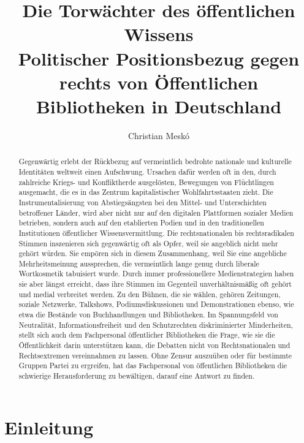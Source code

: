 \documentclass[a4paper,
fontsize=11pt,
oneside,
numbers=noperiodatend,
parskip=half-,
bibliography=totoc,
final
]{scrartcl}
\title{\LARGE{Die Torwächter des öffentlichen Wissens \\ Politischer Positionsbezug gegen rechts von Öffentlichen Bibliotheken in Deutschland}}%
\author{Christian Meskó} %
\date{}
\begin{document}
\maketitle
\thispagestyle{fancyplain} 

\begin{abstract}
Gegenwärtig erlebt der Rückbezug auf vermeintlich bedrohte nationale und
kulturelle Identitäten weltweit einen Aufschwung. Ursachen dafür werden
oft in den, durch zahlreiche Kriegs- und Konfliktherde ausgelösten,
Bewegungen von Flüchtlingen ausgemacht, die es in das Zentrum
kapitalistischer Wohlfahrtsstaaten zieht. Die Instrumentalisierung von
Abstiegsängsten bei den Mittel- und Unterschichten betroffener Länder,
wird aber nicht nur auf den digitalen Plattformen sozialer Medien
betrieben, sondern auch auf den etablierten Podien und in den
traditionellen Institutionen öffentlicher Wissensvermittlung. Die
rechtsnationalen bis rechtsradikalen Stimmen inszenieren sich
gegenwärtig oft als Opfer, weil sie angeblich nicht mehr gehört würden.
Sie empören sich in diesem Zusammenhang, weil Sie eine angebliche
Mehrheitsmeinung aussprechen, die vermeintlich lange genug durch
liberale Wortkosmetik tabuisiert wurde. Durch immer professionellere
Medienstrategien haben sie aber längst erreicht, dass ihre Stimmen im
Gegenteil unverhältnismäßig oft gehört und medial verbreitet werden. Zu
den Bühnen, die sie wählen, gehören Zeitungen, soziale Netzwerke,
Talkshows, Podiumsdiskussionen und Demonstrationen ebenso, wie etwa die
Bestände von Buchhandlungen und Bibliotheken. Im Spannungsfeld von
Neutralität, Informationsfreiheit und den Schutzrechten diskriminierter
Minderheiten, stellt sich auch dem Fachpersonal öffentlicher
Bibliotheken die Frage, wie sie die Öffentlichkeit darin unterstützen
kann, die Debatten nicht von Rechtsnationalen und Rechtsextremen
vereinnahmen zu lassen. Ohne Zensur auszuüben oder für bestimmte Gruppen
Partei zu ergreifen, hat das Fachpersonal von öffentlichen Bibliotheken
die schwierige Herausforderung zu bewältigen, darauf eine Antwort zu
finden.
\end{abstract}

\hypertarget{einleitung}{%
\section*{Einleitung}\label{einleitung}}
\end{document}
